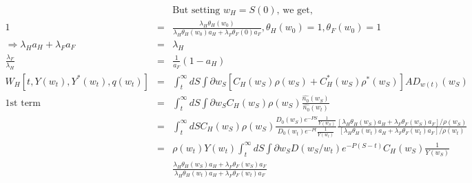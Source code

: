 \documentclass[]{article}
\begin{document}
\begin{eqnarray*}
&& \mbox{But setting $w_H = S(0)$, we get,}\\
1&=& \frac{\lambda_H \theta_H(w_0)}{\lambda_H \theta_H(w_0)a_H + \lambda_F \theta_F(0)a_F}, \theta_H(w_0) = 1, \theta_F(w_0) = 1\\
\Rightarrow \lambda_H a_H + \lambda_F a_F &=& \lambda_H\\
\frac{\lambda_F}{\lambda_H} &=& \frac{1}{a_F} (1-a_H)\\
W_H[t, Y(w_t), Y^*(w_t), q(w_t)] &=& \int_t^\infty dS \int \partial w_S \left[ C_H(w_S) \rho (w_S) + C_H^*(w_S) \rho ^*(w_S) \right] AD_{w(t)} (w_S)\\
\mbox{1st term} &=& \int_t^\infty dS \int \partial w_S C_H(w_S)\rho (w_S) \frac{\hat{n_0}(w_S)}{\hat{n_0}(w_t)}\\
&=& \int_t^\infty dS C_H(w_S)\rho (w_S) \frac{D_0(w_S)e^{-PS}\frac{1}{Y(w_S)}}{D_0(w_t)e^{-Pt}\frac{1}{Y(w_t)}} \frac{[\lambda_H \theta_H(w_S) a_H + \lambda_F \theta_F(w_S)a_F]/\rho(w_S)}{[\lambda_H \theta_H(w_t) a_H + \lambda_F \theta_F(w_t)a_F]/\rho(w_t)}\\
&=& \rho(w_t) Y(w_t) \int_t^\infty dS \int \partial w_S D(w_S/w_t) e^{-P(S-t)} C_H(w_S) \frac{1}{Y(w_S)}\\ &&\frac{\lambda_H \theta_H(w_S) a_H + \lambda_F \theta_F(w_S)a_F}{\lambda_H \theta_H(w_t) a_H + \lambda_F \theta_F(w_t)a_F}\\
\end{eqnarray*}
\end{document}
